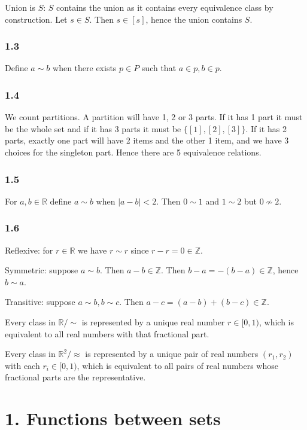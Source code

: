 \documentclass{article}
\def\R{\mathbb{R}}
\def\Z{\mathbb{Z}}
\begin{document}
Union is $S$: $S$ contains the union as it contains every equivalence class by construction. Let $s \in S$. Then $s \in [s]$, hence the union contains $S$.

\subsubsection*{1.3}

Define $a \sim b$ when there exists $p \in P$ such that $a \in p, b \in p$.

\subsubsection*{1.4}

We count partitions. A partition will have 1, 2 or 3 parts. If it has 1 part it must be the whole set and if it has 3 parts it must be $\{[1], [2], [3]\}$. If it has 2 parts, exactly one part will have 2 items and the other 1 item, and we have 3 choices for the singleton part. Hence there are 5 equivalence relations.

\subsubsection*{1.5}

For $a, b \in \R$ define $a \sim b$ when $|a - b| < 2$. Then $0 \sim 1$ and $1 \sim 2$ but $0 \not\sim 2$.

\subsubsection*{1.6}

Reflexive: for $r \in \R$ we have $r \sim r$ since $r - r = 0 \in \Z$.

Symmetric: suppose $a \sim b$. Then $a - b \in \Z$. Then $b - a = -(b - a) \in \Z$, hence $b \sim a$.

Transitive: suppose $a \sim b, b \sim c$. Then $a - c = (a - b) + (b - c) \in \Z$.

Every class in $\R / \sim$ is represented by a unique real number $r \in [0, 1)$, which is equivalent to all real numbers with that fractional part.

Every class in $\R^2 / \approx$ is represented by a unique pair of real numbers $(r_1, r_2)$ with each $r_i \in [0, 1)$, which is equivalent to all pairs of real numbers whose fractional parts are the representative.

\section*{1. Functions between sets}
\end{document}

